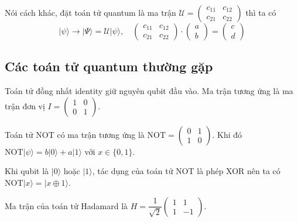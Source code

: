 Nói cách khác, đặt toán tử quantum là ma trận $\mathcal{U} = \begin{pmatrix} c_{11} & c_{12} \\ c_{21} & c_{22} \end{pmatrix}$ thì ta có
\begin{equation*}
    \lvert \psi \rangle \to \lvert \Psi \rangle = \mathcal{U} \lvert \psi \rangle, \quad \begin{pmatrix} c_{11} & c_{12} \\ c_{21} & c_{22} \end{pmatrix} \cdot \begin{pmatrix} a \\ b \end{pmatrix} = \begin{pmatrix} c \\ d \end{pmatrix}
\end{equation*}

\subsection*{Các toán tử quantum thường gặp}

\begin{definition}
    Toán tử đồng nhất identity giữ nguyên qubit đầu vào. Ma trận tương ứng là ma trận đơn vị $I = \begin{pmatrix} 1 & 0 \\ 0 & 1 \end{pmatrix}$.
\end{definition}

\begin{definition}
    Toán tử NOT có ma trận tương ứng là $\text{NOT} = \begin{pmatrix} 0 & 1 \\ 1 & 0 \end{pmatrix}$. Khi đó $\text{NOT} \lvert \psi \rangle = b \lvert 0 \rangle + a \lvert 1 \rangle$ với $x \in \{ 0, 1 \}$.
\end{definition}

Khi qubit là $\lvert 0 \rangle$ hoặc $\lvert 1 \rangle$, tác dụng của toán tử NOT là phép XOR nên ta có $\text{NOT} \lvert x \rangle = \lvert x \oplus 1 \rangle$.

\begin{definition}
    Ma trận của toán tử Hadamard là $H = \dfrac{1}{\sqrt{2}} \begin{pmatrix} 1 & 1 \\ 1 & - 1 \end{pmatrix}$. 
\end{definition}

